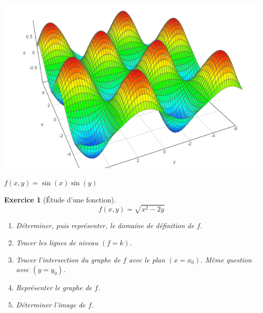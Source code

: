 \documentclass[11pt,a4paper]{article}
\theoremstyle{exostyle}
\newtheorem{exo}{Exercice}
\newcommand{\exercice}[1]{} \newcommand{\finexercice}{}
\newcommand{\enonce}{\begin{exo}} \newcommand{\finenonce}{\end{exo}}
\newcommand{\noindication}{\stepcounter{ind}}
\begin{document}
\begin{center}
	\small
	\includegraphics[scale=0.5]{figures-exercices/fpv-fiche1-exo3-fig5}
	
    $f(x,y) = \sin(x)\sin(y)$
\end{center}		
\fincorrection

\finexercice
	
		
\exercice{}
\enonce[Étude d'une fonction]
$$f(x,y) = \sqrt{x^2-2y}$$
\begin{enumerate}
	\item Déterminer, puis représenter, le domaine de définition de $f$.
	\item Tracer les lignes de niveau $(f=k)$.
    \item Tracer l'intersection du graphe de $f$ avec le plan $(x=x_0)$. Même question avec $(y=y_0)$.
    \item Représenter le graphe de $f$.
    \item Déterminer l'image de $f$.
\end{enumerate}
\finenonce

\noindication
\end{document}
